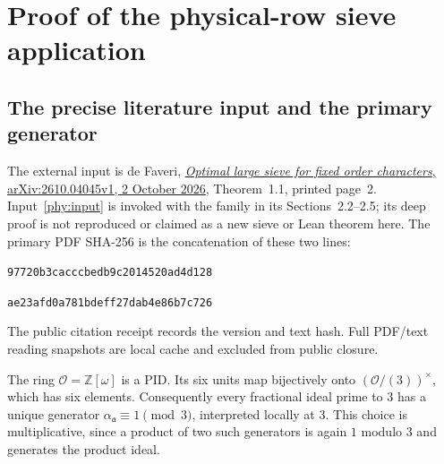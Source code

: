 \section{Proof of the physical-row sieve application}\label{phy:details}
\subsection{The precise literature input and the primary generator}
The external input is de Faveri,
\href{https://arxiv.org/abs/2610.04045v1}{\emph{Optimal large sieve for
fixed order characters}, arXiv:2610.04045v1, 2 October 2026},
Theorem~1.1, printed page~2. Input~\eqref{phy:input} is invoked with
the family in its Sections~2.2--2.5; its deep proof is not reproduced
or claimed as a new sieve or Lean theorem here. The primary PDF SHA-256 is the concatenation of these two lines:
\par\noindent\texttt{97720b3cacccbedb9c2014520ad4d128}\par
\noindent\texttt{ae23afd0a781bdeff27dab4e86b7c726}\par
The public citation receipt records the version and text hash. Full
PDF/text reading snapshots are local cache and excluded from public closure.

The ring $\mathcal O=\mathbb Z[\omega]$ is a PID. Its six units map
bijectively onto $(\mathcal O/(3))^\times$, which has six elements.
Consequently every fractional ideal prime to $3$ has a unique generator
$\alpha_{\mathfrak a}\equiv1\pmod3$, interpreted locally at $3$.
This choice is multiplicative, since a product of two such generators
is again $1$ modulo $3$ and generates the product ideal.

